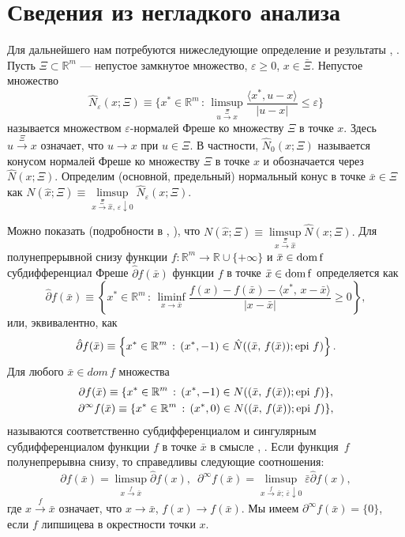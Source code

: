 \documentclass{report}
\newcommand{\dom}{\rm dom}
\newcommand{\epi}{\mathop{\rm epi}}
\begin{document}
        \section{Сведения из негладкого анализа}
Для дальнейшего нам потребуются нижеследующие определение и результаты \cite{mord1}, \cite{mordukh}. Пусть $\Xi\subset \mathbb{R}^m$ --- непустое замкнутое множество,
$\varepsilon\geqslant0$, $x\in\bar{\Xi}$. Непустое множество
$$
\hat{N}_\varepsilon(x;\Xi)\equiv\{x^*\in \mathbb{R}^m\,:\,\limsup\limits_{u\stackrel{\Xi}{\rightarrow}x}
\frac{\displaystyle \langle x^*,u-x\rangle}{\displaystyle |u-x|}\leqslant\varepsilon\}
$$
называется множеством $\varepsilon$-нормалей Фреше ко множеству $\Xi$ в точке $x$. Здесь $u\stackrel{\Xi}{\rightarrow}x$ означает, что $u\to x$ при $u\in \Xi$. В частности,
$\hat{N}_0(x;\Xi)$ называется конусом нормалей Фреше ко множеству $\Xi$ в точке $x$ и обозначается через $\hat{N}(x;\Xi)$. Определим (основной, предельный) нормальный конус в точке
$\bar{x}\in\Xi$ как $N(\hat{x};\Xi)\equiv\limsup\limits_{x\stackrel{\Xi}{\rightarrow}\hat{x},\,\varepsilon\downarrow0}\hat{N}_\varepsilon(x;\Xi)$.

Можно показать (подробности в \cite{mord1}, \cite{mordukh}), что $N(\hat{x};\Xi)\equiv\limsup\limits_{x\stackrel{\Xi}{\rightarrow}\hat{x}}\hat{N}(x;\Xi).$ Для полунепрерывной снизу функции
$f\colon \mathbb{R}^m\to \mathbb{R}\cup\{+\infty\}$ и $\bar{x}\in \dom\, f$ субдифференциал Фреше $\hat{\partial}f(\bar{x})$ функции $f$ в точке $\bar{x}\in\dom\,f$ определяется как
$$
\displaystyle \hat{\partial}f(\bar{x})\equiv \left\{x^*\in\mathbb{R}^m\,:\,\liminf\limits_{x\to\bar{x}} \frac{f(x)-f(\bar{x})-\langle x^*,\,x-\bar{x}\rangle}{|x-\bar{x}|}\geqslant0\right\},
$$
или, эквивалентно, как
$$
\displaystyle\hat{\partial}f(\bar{x})\equiv\left\{x^*\in \mathbb{R}^m\,:\,(x^*,-1)\in\hat{N}((\bar{x},\,f(\bar{x}));\epi\,f)\right\}.
$$
Для любого $\bar{x}\in dom\,f$ множества
\begin{gather*}
\partial f(\bar{x})\equiv\{x^*\in \mathbb{R}^m\,:\,(x^*,-1)\in N((\bar{x},\,f(\bar{x}));\epi\, f)\},\\
\partial^\infty f(\bar{x})\equiv\{x^*\in \mathbb{R}^m\,:\,(x^*,0)\in N((\bar{x},\,f(\bar{x}));\epi\, f)\},
\end{gather*}
называются соответственно субдифференциалом и сингулярным субдифференциалом функции $f$ в точке $\bar{x}$ в смысле \cite{mord1},
\cite{mordukh}. Если функция~$f$ полунепрерывна снизу, то справедливы следующие соотношения:
\begin{equation}\label{repsd}
\partial f(\bar{x})=\limsup\limits_{x\stackrel{f}{\rightarrow}\bar{x}}\hat{\partial}f(x),\,\,\,
\partial^\infty f(\bar{x})=\limsup\limits_{x\stackrel{f}{\rightarrow}\bar{x};\,\bar\varepsilon\downarrow0}\bar\varepsilon\hat{\partial}f(x),
\end{equation}
где $x\stackrel{f}{\rightarrow}\bar{x}$ означает, что $x\to\bar{x}$, $f(x)\to f(\bar{x})$. Мы имеем $\partial^\infty f(\bar{x})=\{0\}$, если $f$ липшицева в окрестности точки $x$.
\end{document}
